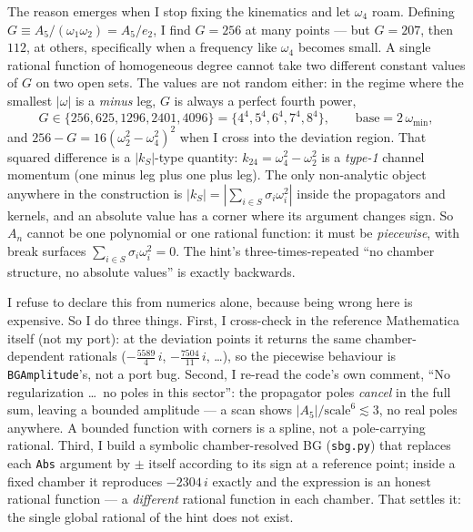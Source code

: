 \documentclass{article}
\begin{document}
The reason emerges when I stop fixing the kinematics and let $\omega_4$ roam.
Defining $G\equiv A_5/(\omega_1\omega_2)=A_5/e_2$, I find $G=256$ at many points
--- but $G=207$, then $112$, at others, specifically when a frequency like
$\omega_4$ becomes small. A single rational function of homogeneous degree cannot
take two different constant values of $G$ on two open sets. The values are not
random either: in the regime where the smallest $|\omega|$ is a \emph{minus} leg,
$G$ is always a perfect fourth power,
\[
G\in\{256,625,1296,2401,4096\}=\{4^4,5^4,6^4,7^4,8^4\},
\qquad \text{base}=2\,\omega_{\min},
\]
and $256-G=16(\omega_2^2-\omega_4^2)^2$ when I cross into the deviation region.
That squared difference is a $|k_S|$-type quantity: $k_{24}=\omega_4^2-\omega_2^2$
is a \emph{type-1} channel momentum (one minus leg plus one plus leg). The only
non-analytic object anywhere in the construction is $|k_S|=|\sum_{i\in
S}\sigma_i\omega_i^2|$ inside the propagators and kernels, and an absolute value
has a corner where its argument changes sign. So $A_n$ cannot be one polynomial or
one rational function: it must be \emph{piecewise}, with break surfaces
$\sum_{i\in S}\sigma_i\omega_i^2=0$. The hint's three-times-repeated ``no chamber
structure, no absolute values'' is exactly backwards.

I refuse to declare this from numerics alone, because being wrong here is
expensive. So I do three things. First, I cross-check in the reference
Mathematica itself (not my port): at the deviation points it returns the same
chamber-dependent rationals ($-\tfrac{5589}{4}\,i$, $-\tfrac{7504}{11}\,i$, \dots),
so the piecewise behaviour is \texttt{BGAmplitude}'s, not a port bug. Second, I
re-read the code's own comment, ``No regularization \dots\ no poles in this
sector'': the propagator poles \emph{cancel} in the full sum, leaving a bounded
amplitude --- a scan shows $|A_5|/\text{scale}^6\lesssim3$, no real poles
anywhere. A bounded function with corners is a spline, not a pole-carrying
rational. Third, I build a symbolic chamber-resolved BG (\texttt{sbg.py}) that
replaces each \texttt{Abs} argument by $\pm$ itself according to its sign at a
reference point; inside a fixed chamber it reproduces $-2304\,i$ exactly and the
expression is an honest rational function --- a \emph{different} rational function
in each chamber. That settles it: the single global rational of the hint does not
exist.
\end{document}
